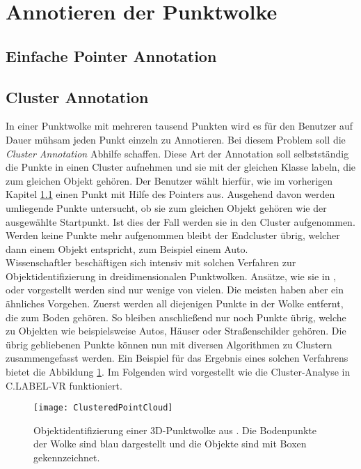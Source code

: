 \section{Annotieren der Punktwolke}
\label{sec:Annotation}
\subsection{Einfache Pointer Annotation}
\label{sec:SimplePointerAnnotation}

\subsection{Cluster Annotation}
In einer Punktwolke mit mehreren tausend Punkten wird es für den Benutzer auf Dauer mühsam jeden Punkt einzeln zu Annotieren. Bei diesem Problem soll die \textit{Cluster Annotation} Abhilfe schaffen. Diese Art der Annotation soll selbstständig die Punkte in einen Cluster aufnehmen und sie mit der gleichen Klasse labeln, die zum gleichen Objekt gehören. Der Benutzer wählt hierfür, wie im vorherigen Kapitel \ref{sec:SimplePointerAnnotation} einen Punkt mit Hilfe des Pointers aus. Ausgehend davon werden umliegende Punkte untersucht, ob sie zum gleichen Objekt gehören wie der ausgewählte Startpunkt. Ist dies der Fall werden sie in den Cluster aufgenommen. Werden keine Punkte mehr aufgenommen bleibt der Endcluster übrig, welcher dann einem Objekt entspricht, zum Beispiel einem Auto. \\

Wissenschaftler beschäftigen sich intensiv mit solchen Verfahren zur Objektidentifizierung in dreidimensionalen Punktwolken. Ansätze, wie sie in \cite{bib:Segmentation1}, \cite{bib:Segmentation2} oder \cite{bib:Segmentation3} vorgestellt werden sind nur wenige von vielen. Die meisten haben aber ein ähnliches Vorgehen. Zuerst werden all diejenigen Punkte in der Wolke entfernt, die zum Boden gehören. So bleiben anschließend nur noch Punkte übrig, welche zu Objekten wie beispielsweise Autos, Häuser oder Straßenschilder gehören. Die übrig gebliebenen Punkte können nun mit diversen Algorithmen zu Clustern zusammengefasst werden. Ein Beispiel für das Ergebnis eines solchen Verfahrens bietet die Abbildung \ref{fig:ClusteredCloud}. Im Folgenden wird vorgestellt wie die Cluster-Analyse in C.LABEL-VR funktioniert.

\begin{figure}%
	\centering
    \texttt{[image: ClusteredPointCloud]}
    \caption{Objektidentifizierung einer 3D-Punktwolke aus \cite{bib:Segmentation1}. Die Bodenpunkte der Wolke sind blau dargestellt und die Objekte sind mit Boxen gekennzeichnet.}
    \label{fig:ClusteredCloud}
\end{figure}

